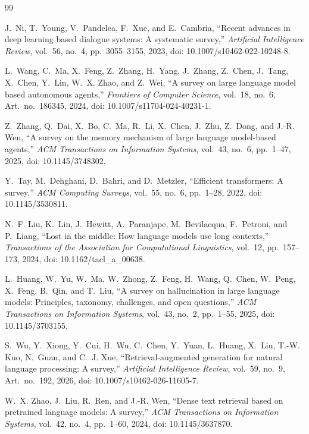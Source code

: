 \documentclass[journal]{IEEEtran}
\begin{document}
\begin{thebibliography}{99}

J.~Ni, T.~Young, V.~Pandelea, F.~Xue, and E.~Cambria, ``Recent advances in deep learning based dialogue systems: A systematic survey,'' \emph{Artificial Intelligence Review}, vol.~56, no.~4, pp.~3055--3155, 2023, doi: 10.1007/s10462-022-10248-8.

L.~Wang, C.~Ma, X.~Feng, Z.~Zhang, H.~Yang, J.~Zhang, Z.~Chen, J.~Tang, X.~Chen, Y.~Lin, W.~X. Zhao, and Z.~Wei, ``A survey on large language model based autonomous agents,'' \emph{Frontiers of Computer Science}, vol.~18, no.~6, Art.~no.~186345, 2024, doi: 10.1007/s11704-024-40231-1.

Z.~Zhang, Q.~Dai, X.~Bo, C.~Ma, R.~Li, X.~Chen, J.~Zhu, Z.~Dong, and J.-R. Wen, ``A survey on the memory mechanism of large language model-based agents,'' \emph{ACM Transactions on Information Systems}, vol.~43, no.~6, pp.~1--47, 2025, doi: 10.1145/3748302.

Y.~Tay, M.~Dehghani, D.~Bahri, and D.~Metzler, ``Efficient transformers: A survey,'' \emph{ACM Computing Surveys}, vol.~55, no.~6, pp.~1--28, 2022, doi: 10.1145/3530811.

N.~F. Liu, K.~Lin, J.~Hewitt, A.~Paranjape, M.~Bevilacqua, F.~Petroni, and P.~Liang, ``Lost in the middle: How language models use long contexts,'' \emph{Transactions of the Association for Computational Linguistics}, vol.~12, pp.~157--173, 2024, doi: 10.1162/tacl\_a\_00638.

L.~Huang, W.~Yu, W.~Ma, W.~Zhong, Z.~Feng, H.~Wang, Q.~Chen, W.~Peng, X.~Feng, B.~Qin, and T.~Liu, ``A survey on hallucination in large language models: Principles, taxonomy, challenges, and open questions,'' \emph{ACM Transactions on Information Systems}, vol.~43, no.~2, pp.~1--55, 2025, doi: 10.1145/3703155.

S.~Wu, Y.~Xiong, Y.~Cui, H.~Wu, C.~Chen, Y.~Yuan, L.~Huang, X.~Liu, T.-W. Kuo, N.~Guan, and C.~J. Xue, ``Retrieval-augmented generation for natural language processing: A survey,'' \emph{Artificial Intelligence Review}, vol.~59, no.~9, Art.~no.~192, 2026, doi: 10.1007/s10462-026-11605-7.

W.~X. Zhao, J.~Liu, R.~Ren, and J.-R. Wen, ``Dense text retrieval based on pretrained language models: A survey,'' \emph{ACM Transactions on Information Systems}, vol.~42, no.~4, pp.~1--60, 2024, doi: 10.1145/3637870.


\end{thebibliography}
\end{document}
